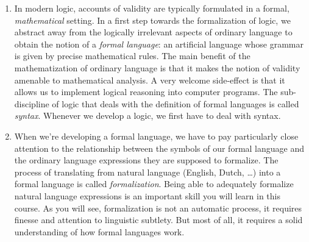 \begin{enumerate}[\thesection.1]
	Inference (1) is clearly a pretty solid piece of reasoning. If you know for sure that the letter is either in the left or in the right drawer, but you can exclude that it's in the left drawer, then the letter \emph{must} be in the right drawer. Inference (2), in contrast, is pretty bad. Sure, if the ball is scarlet, then it's red. That's a conceptual truth. And let's grant for the sake of argument that the ball is red. But that doesn't mean that the ball has to be scarlet. There are many other shades of red: crimson, burgundy, maroon, \dots. In logician's terminology, (1) is a \emph{valid} inference, while (2) is \emph{in}valid. The aim of logic is to develop a theory of valid inference.\footnote{The notion of validity at play here, the one that mathematical logic courses typically focus on, is a very strong notion of validity: it requires that the truth of the premises \emph{necessitates} the truth of the conclusion. The notion is also known as \emph{deductive} validity in the literature. In this course, we'll be exclusively concerned with deductive validity and I shall, correspondingly, omit the qualifying adjective. Other, weaker notions of validity include, for example, what's known in the literature as \emph{inductive} validity, where it's only required that the premises make the conclusion \emph{more likely}. Inductive validity is of special importance, for example, in scientific reasoning and it's mainly dealt with in courses on probability theory and statistics.}
	
	\item \label{intro:valid:math1} In modern logic, accounts of validity are typically formulated in a formal, \emph{mathematical} setting. In a first step towards the formalization of logic, we abstract away from the logically irrelevant aspects of ordinary language to obtain the notion of a \emph{formal language}: an artificial language whose grammar is given by precise mathematical rules. The main benefit of the mathematization of ordinary language is that it makes the notion of validity amenable to mathematical analysis. A very welcome side-effect is that it allows us to implement logical reasoning into computer programs. The sub-discipline of logic that deals with the definition of formal languages is called \emph{syntax}. Whenever we develop a logic, we first have to deal with syntax.   
	
	\item When we're developing a formal language, we have to pay particularly close attention to the relationship between the symbols of our formal language and the ordinary language expressions they are supposed to formalize. The process of translating from natural language (English, Dutch, \dots) into a formal language is called \emph{formalization}. Being able to adequately formalize natural language expressions is an important skill you will learn in this course. As you will see, formalization is not an automatic process, it requires finesse and attention to linguistic subtlety. But most of all, it requires a solid understanding of how formal languages work.
	

\end{enumerate}
